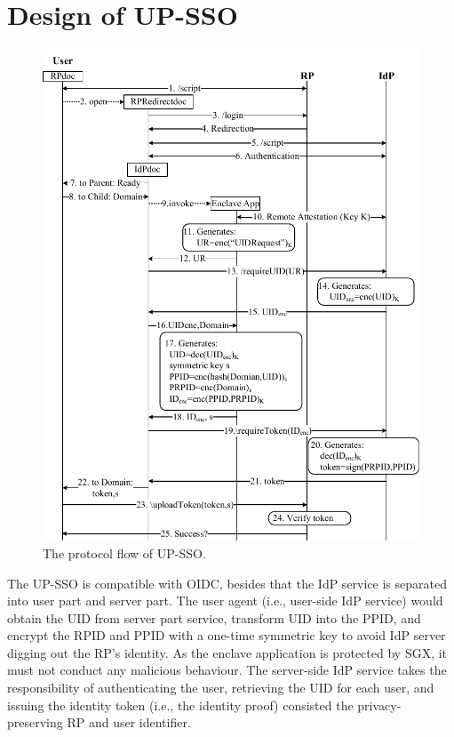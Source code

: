 \section{Design of UP-SSO}
\label{sec:design}
\begin{figure}[t!]
  \centering
  \includegraphics[width=\linewidth]{fig/sgx-sso.pdf}
  \caption{The protocol flow of UP-SSO.}
  \label{fig:UP-SSO}
\end{figure}
The UP-SSO is compatible with OIDC, besides that the IdP service is separated into user part and server part. 
The user agent (i.e., user-side IdP service) would obtain the UID from server part service, transform UID into the PPID, and encrypt the RPID and PPID with a one-time symmetric key to avoid IdP server digging out the RP's identity. As the enclave application is protected by SGX, it must not conduct any malicious behaviour. 
The server-side IdP service takes the responsibility of authenticating the user, retrieving the UID for each user, and issuing the identity token (i.e., the identity proof) consisted the privacy-preserving RP and user identifier.


